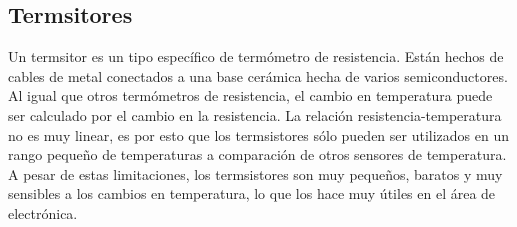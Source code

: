 \documentclass[12pt, letterpaper]{article}
\begin{document}
\subsection{Termsitores}
Un termsitor es un tipo específico de termómetro de resistencia. Están hechos de cables de metal conectados a una base cerámica hecha de varios semiconductores. Al igual que otros termómetros de resistencia, el cambio en temperatura puede ser calculado por el cambio en la resistencia. La relación resistencia-temperatura no es muy linear, es por esto que los termsistores sólo pueden ser utilizados en un rango pequeño de temperaturas a comparación de otros sensores de temperatura. A pesar de estas limitaciones, los termsistores son muy pequeños, baratos y muy sensibles a los cambios en temperatura, lo que los hace muy útiles en el área de electrónica.


\end{document}
